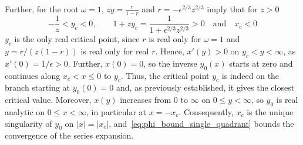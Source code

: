 \documentclass[a4paper]{amsart}
\begin{document}
Further, for the root $\omega=1$, $zy = \frac{r}{1-r}$ and $r=-\epsilon^{2/3}z^{2/3}$ imply that for $z>0$
\begin{equation*}
-\frac{1}{z}<y_c<0,
\qquad
1+zy_c=\frac{1}{1+\epsilon^{2/3}z^{2/3}}>0
\quad\text{and}\quad
x_c<0
\end{equation*}
$y_c$ is the only real critical point, since $r$ is real only for $\omega=1$ and $y=r/(z(1-r))$ is real only for real $r$. Hence, $x'(y)>0$ on $y_c<y<\infty$, as $x'(0)=1/\epsilon>0$. Further, $x(0)=0$, so the inverse $y_0(x)$ starts at zero and continues along $x_c<x\leq0$ to $y_c$. Thus, the critical point $y_c$ is indeed on the branch starting at $y_0(0)=0$ and, as previously established, it gives the closest critical value. Moreover, $x(y)$ increases from $0$ to $\infty$ on $0\leq y<\infty$, so $y_0$ is real analytic on $0\leq x<\infty$, in particular at $x=-x_c$. Consequently, $x_c$ is the unique singularity of $y_0$ on $|x|=|x_c|$, and~\eqref{eq:phi_bound_single_quadrant} bounds the convergence of the series expansion.
\end{document}
